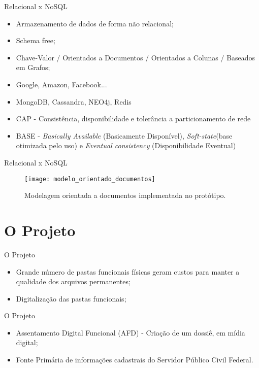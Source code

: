 \begin{frame}{Relacional x NoSQL}
    \begin{itemize}
    \item Armazenamento de dados de forma não relacional;
    \item Schema free;
    \item Chave-Valor / Orientados a Documentos / Orientados a Colunas / Baseados em Grafos;
    \item Google, Amazon, Facebook...
    \item MongoDB, Cassandra, NEO4j, Redis
    \item CAP - Consistência,  disponibilidade e tolerância a particionamento de rede
    \item BASE - \textit{Basically Available} (Basicamente Disponível), \textit{Soft-state}(base otimizada pelo uso) e \textit{Eventual consistency} (Disponibilidade Eventual)
    \end{itemize}
\end{frame}

\begin{frame}{Relacional x NoSQL}
	\begin{figure}[!htbp]
		\begin{center}
			\texttt{[image: modelo\_orientado\_documentos]}
		\end{center}
		\caption{ Modelagem orientada a documentos implementada no protótipo.}
		\label{fig:modeloorientadodocumentos}
	\end{figure}
\end{frame}

\section{O Projeto}

\begin{frame}{O Projeto}
    \begin{itemize}
	\item Grande número de pastas funcionais físicas geram custos para manter a qualidade dos arquivos permanentes;
	\item Digitalização das pastas funcionais;
    \end{itemize}
\end{frame}

\begin{frame}{O Projeto}
    \begin{itemize}
	\item Assentamento Digital Funcional (AFD) - Criação de um dossiê, em mídia digital;
	\item Fonte Primária de informações cadastrais do Servidor Público Civil Federal.
    \end{itemize}
\end{frame}

